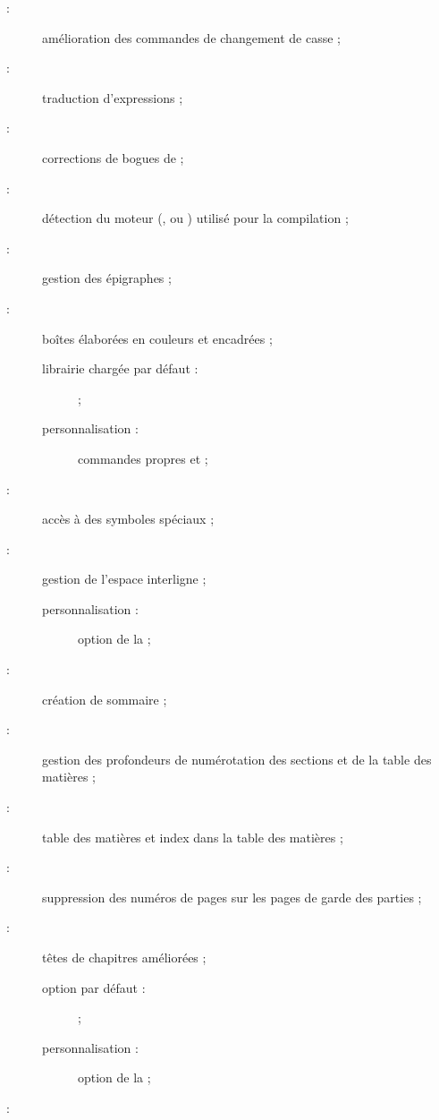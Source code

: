 \begin{description}
\item[ :] amélioration des commandes de changement de
  casse ;
\item[ :] traduction d'expressions ;
\item[ :] corrections de bogues de  ;
\item[ :] détection du moteur (, 
  ou ) utilisé pour la compilation ;
\item[ :] gestion des épigraphes ;
\item[ :] boîtes élaborées en couleurs et encadrées ;
  \begin{description}
  \item[librairie chargée par défaut :]  ;
  \item[personnalisation :] commandes propres  et
     ;
  \end{description}
\item[ :] accès à des symboles spéciaux ;
\item[ :] gestion de l'espace interligne ;
  \begin{description}
  \item[personnalisation :] option  de la \yatCl ;
  \end{description}
\item[ :] création de sommaire ;
\item[ :] gestion des profondeurs de numérotation des
  sections et de la table des matières ;
\item[ :] table des matières et index dans la table des
  matières ;
\item[ :] suppression des numéros de pages sur les pages
  de garde des parties ;
\item[ :] têtes de chapitres améliorées ;
  \begin{description}
  \item[option par défaut :]  ;
  \item[personnalisation :] option  de la \yatCl ;
  \end{description}
\item[ :] %

\end{description}
